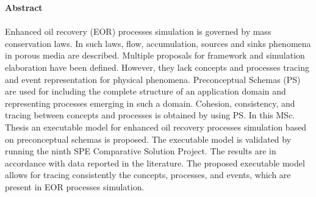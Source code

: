 







\textbf{\LARGE Abstract}\\\\
Enhanced oil recovery (EOR) processes simulation is governed by mass conservation laws. In such laws, flow, accumulation, sources and sinks phenomena in porous media are described. Multiple proposals for framework and simulation elaboration have been defined. However, they lack concepts and processes tracing and event representation for physical phenomena. Preconceptual Schemas (PS) are used for including the complete structure of an application domain and representing processes emerging in such a domain. Cohesion, consistency, and tracing between concepts and processes is obtained by using PS. In this MSc. Thesis an executable model for enhanced oil recovery processes simulation based on preconceptual schemas is proposed. The executable model is validated by running the ninth SPE Comparative Solution Project. The results are in accordance with data reported in the literature. The proposed executable model allows for tracing consistently the concepts, processes, and events, which are present in EOR processes simulation. \\

